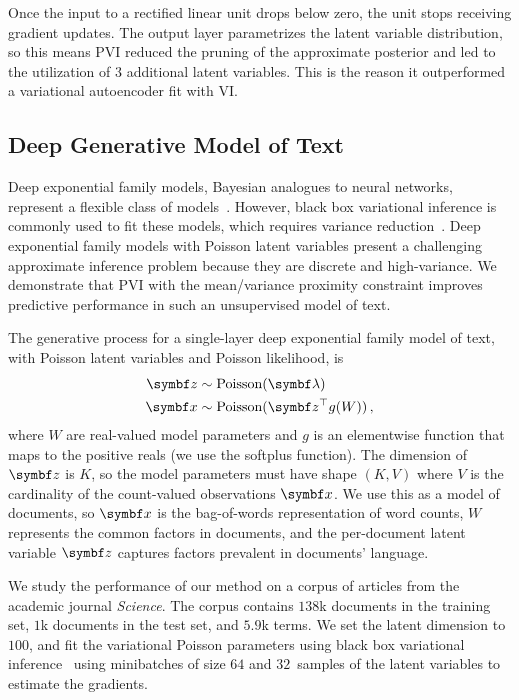 Once the input to a rectified linear unit drops below zero, the unit stops receiving gradient updates. The output layer parametrizes the latent variable distribution, so this means \gls{PVI} reduced the pruning of the approximate posterior and led to the utilization of $3$ additional latent variables. This is the reason it outperformed a variational autoencoder fit with \gls{VI}.


\subsection{Deep Generative Model of Text}
\label{sec:poisson_factor_analysis}
Deep exponential family models, Bayesian analogues to neural networks, represent a flexible class of models~\citep{ranganath2015deep}. However, black box variational inference is commonly used to fit these models, which requires variance reduction~\citep{ranganath2014black}. Deep exponential family models with Poisson latent variables present a challenging approximate inference problem because they are discrete and high-variance. We demonstrate that \gls{PVI} with the mean/variance proximity constraint improves predictive performance in such an unsupervised model of text.

The generative process for a single-layer deep exponential family model of text, with Poisson latent variables and Poisson likelihood, is
\begin{align*}
\mbz &\sim \textrm{Poisson}(\mblambda) \\
\mbx &\sim \textrm{Poisson}(\mbz^\top g(W)) \,,
\end{align*}
where $W$ are real-valued model parameters and $g$ is an elementwise function that maps to the positive reals (we use the softplus function). The dimension of $\mbz$ is $K$, so the model parameters must have shape $(K, V)$ where $V$ is the cardinality of the count-valued observations $\mbx$. We use this as a model of documents, so $\mbx$ is the bag-of-words representation of word counts, $W$ represents the common factors in documents, and the per-document latent variable $\mbz$ captures factors prevalent in documents' language.

We study the performance of our method on a corpus of articles from the academic journal \emph{Science}. The corpus contains $138$k documents in the training set, $1$k documents in the test set, and $5.9$k terms. We set the latent dimension to $100$, and fit the variational Poisson parameters using black box variational inference~\citep{ranganath2014black} using minibatches of size $64$ and $32$~samples of the latent variables to estimate the gradients.

